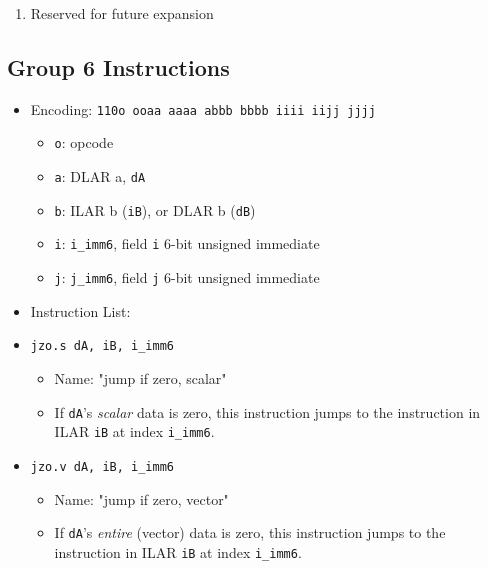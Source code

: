 \documentclass{article}
\begin{document}
\begin{itemize}
\begin{enumerate}
			\item Reserved for future expansion
			\end{enumerate}
		\end{itemize}

	\subsection{Group 6 Instructions}
		\begin{itemize}
		\item Encoding:  \texttt{110o ooaa aaaa abbb  bbbb iiii iijj jjjj}
			\begin{itemize}
			\item \texttt{o}:  opcode
			\item \texttt{a}:  DLAR a, \texttt{dA}
			\item \texttt{b}:  ILAR b (\texttt{iB}), or DLAR b
				(\texttt{dB})
			\item \texttt{i}:  \texttt{i\_imm6}, field \texttt{i} 6-bit
				unsigned immediate
			\item \texttt{j}:  \texttt{j\_imm6}, field \texttt{j} 6-bit
				unsigned immediate
			\end{itemize}
		\item Instruction List:
			\item \texttt{jzo.s dA, iB, i\_imm6}
				\begin{itemize}
				\item Name:  "jump if zero, scalar"
				\item If \texttt{dA}'s \textit{scalar} data is zero, this
					instruction jumps to the instruction in ILAR
					\texttt{iB} at index \texttt{i\_imm6}.
				\end{itemize}
			\item \texttt{jzo.v dA, iB, i\_imm6}
				\begin{itemize}
				\item Name:  "jump if zero, vector"
				\item If \texttt{dA}'s \textit{entire} (vector) data is
					zero, this instruction jumps to the instruction in ILAR
					\texttt{iB} at index \texttt{i\_imm6}.
				\end{itemize}


\end{itemize}
\end{document}
